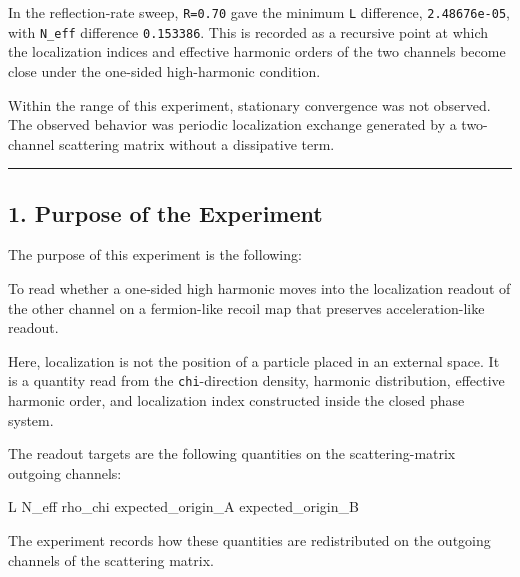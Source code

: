 \documentclass[
]{article}
\newenvironment{Shaded}{}{}
\newcommand{\NormalTok}[1]{#1}
\begin{document}
In the reflection-rate sweep, \texttt{R=0.70} gave the minimum
\texttt{L} difference, \texttt{2.48676e-05}, with \texttt{N\_eff}
difference \texttt{0.153386}. This is recorded as a recursive point at
which the localization indices and effective harmonic orders of the two
channels become close under the one-sided high-harmonic condition.

Within the range of this experiment, stationary convergence was not
observed. The observed behavior was periodic localization exchange
generated by a two-channel scattering matrix without a dissipative term.

\begin{center}\rule{0.5\linewidth}{0.5pt}\end{center}

\subsection{1. Purpose of the
Experiment}\label{purpose-of-the-experiment}

The purpose of this experiment is the following:

\begin{Shaded}
\begin{Highlighting}[]
\NormalTok{To read whether a one{-}sided high harmonic moves into the localization readout}
\NormalTok{of the other channel on a fermion{-}like recoil map that preserves acceleration{-}like readout.}
\end{Highlighting}
\end{Shaded}

Here, localization is not the position of a particle placed in an
external space. It is a quantity read from the \texttt{chi}-direction
density, harmonic distribution, effective harmonic order, and
localization index constructed inside the closed phase system.

The readout targets are the following quantities on the
scattering-matrix outgoing channels:

\begin{Shaded}
\begin{Highlighting}[]
\NormalTok{L}
\NormalTok{N\_eff}
\NormalTok{rho\_chi}
\NormalTok{expected\_origin\_A}
\NormalTok{expected\_origin\_B}
\end{Highlighting}
\end{Shaded}

The experiment records how these quantities are redistributed on the
outgoing channels of the scattering matrix.
\end{document}

